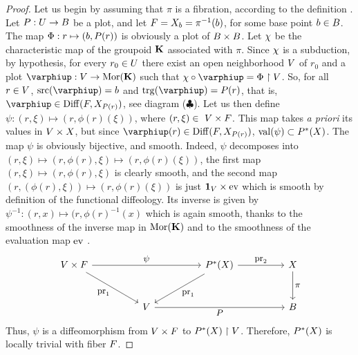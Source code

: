 \begin{proof}
  Let us begin by assuming that $\pi$ is a fibration,
  according to the definition .
  Let $\P : \U \to \B$ be a plot,
  and let $\F = \X_b = \pi^{-1}(b)$,
  for some base point $b \in \B$.
  The map $\Phi : r \mapsto (b,\P(r))$ is obviously a plot of $\B \times \B$.
  Let $\car$ be the characteristic map of the groupoid $\KK$ associated with $\pi$.
  Since $\car$ is a subduction,
  by hypothesis,
  for every $r_0 \in \U$ there exist an open neighborhood $\V$ of $r_0$ and a plot $\phi : \V \to \Mor(\KK)$ such that $\car \circ \phi = \Phi \restriction \V$.
  So,
  for all $r \in \V$, $\source(\phi) = b$ and $\target(\phi) = \P(r)$,
  that is,
  $\phi \in \Diff(\F, \X_{\P(r)})$,
  see diagram ($\clubsuit$).
  Let us then define $\psi : (r,\xi) \mapsto (r, \phi(r)(\xi))$,
  where $(r,\xi) \in \ \V \times \F$.
  This map takes {\em a priori\/} its values in $\V \times \X$,
  but since $\phi(r) \in \Diff(\F,\X_{\P(r)})$,
  $\Val(\psi) \subset \P^*(\X)$.
  The map $\psi$ is obviously bijective,
  and smooth.
  Indeed,
  $\psi$ decomposes into $(r,\xi) \mapsto (r,\phi(r), \xi) \mapsto (r, \phi(r)(\xi))$,
  the first map $(r,\xi) \mapsto (r,\phi(r), \xi)$ is clearly smooth,
  and the second map $(r,(\phi(r), \xi)) \mapsto (r, \phi(r)(\xi))$ is just $\id_\V \times \ev$ which is smooth by definition of the functional diffeology.
  Its inverse is given by $\psi^{-1} : (r,x) \mapsto (r, \phi(r)^{-1}(x)$ which is again smooth,
  thanks to the smoothness of the inverse map in $\Mor(\KK)$ and to the smoothness of the evaluation map $\ev$ .
  \begin{equation} \renewcommand{\theequation}{$\clubsuit$}
    \begin{tikzcd}[column sep=huge, row sep=large, every label/.append style = {font = \small}]
      \V \times \F \arrow[dr, swap,"\pr_1"] \arrow[rr, "\psi"] & {} & \P^*(\X) \arrow[dl, "\pr_1"] \arrow[r, "\pr_2"] & \X \arrow[d, "\pi"] \\
      {}  & \V \arrow[rr, swap, "\P"] &  {} & \B
    \end{tikzcd}
  \end{equation}
  Thus,
  $\psi$ is a diffeomorphism from $\V \times \F$ to $\P^*(\X) \restriction \V$.
  Therefore,
  $\P^*(\X)$ is locally trivial with fiber $\F$.
  

\end{proof}
